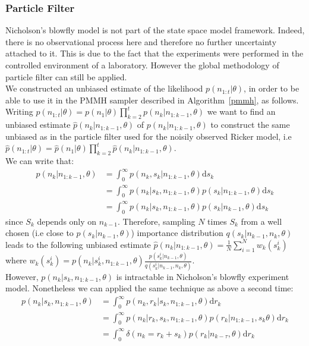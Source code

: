 \documentclass[12pt]{article}
\begin{document}
	\subsubsection{Particle Filter}
	Nicholson's blowfly model is not part of the state space model framework. Indeed, there is no observational process here and therefore no further uncertainty attached to it. This is due to the fact that the experiments were performed in the controlled environment of a laboratory. However the global methodology of particle filter can still be applied. \\
	We constructed an unbiased estimate of the likelihood $p(n_{1:t}|\theta)$, in order to be able to use it in the PMMH sampler described in Algorithm~\ref{pmmh}, as follows. \\
	Writing $p(n_{1:t}|\theta) = p(n_1|\theta)\prod_{k=2}^{t}p(n_k|n_{1:k-1}, \theta)$ we want to find an unbiased estimate $\hat{p}(n_k|n_{1:k-1}, \theta)$ of $p(n_k|n_{1:k-1}, \theta)$ to construct the same unbiased as in the particle filter used for the noisily observed Ricker model, i.e $\hat{p}(n_{1:t}|\theta)=\hat{p}(n_1|\theta)\prod_{k=2}^{t}\hat{p}(n_k|n_{1:k-1}, \theta)$. \\
	We can write that:
	\begin{align*}
	p(n_k|n_{1:k-1}, \theta) & = \int_{0}^{\infty}p(n_k, s_k |n_{1:k-1}, \theta)\mathrm{d}s_k \\
	& = \int_{0}^{\infty}p(n_k |s_k, n_{1:k-1}, \theta)p(s_k|n_{1:k-1}, \theta)\mathrm{d}s_k \\
	& = \int_{0}^{\infty}p(n_k |s_k, n_{1:k-1}, \theta)p(s_k|n_{k-1}, \theta)\mathrm{d}s_k
	\end{align*}
	since $S_k$ depends only on $n_{k-1}$.
	Therefore, sampling $N$ times $S_k$ from a well chosen (i.e close to $p(s_k|n_{k-1}, \theta)$) importance distribution $q(s_k|n_{k-1}, n_k, \theta)$ leads to the following unbiased estimate $\hat{p}(n_k|n_{1:k-1}, \theta) = \frac{1}{N}\sum_{i=1}^{N}w_k(s_k^i)$ where $w_k(s_k^i) =p(n_k |s_k^i, n_{1:k-1}, \theta)\frac{p(s_k^i|n_{k-1}, \theta)}{q(s_k^i|n_{k-1}, n_k, \theta)}$. \\
	However, $p(n_k |s_k, n_{1:k-1}, \theta)$ is intractable in Nicholson's blowfly experiment model. Nonetheless we can applied the same technique as above a second time:
	\begin{align*}
	p(n_k |s_k, n_{1:k-1}, \theta) & = \int_{0}^{\infty}p(n_k, r_k|s_k, n_{1:k-1}, \theta)\mathrm{d}r_k \\
	& = \int_{0}^{\infty}p(n_k| r_k, s_k, n_{1:k-1}, \theta)p( r_k|n_{1:k-1}, s_k \theta)\mathrm{d}r_k \\
	& = \int_{0}^{\infty}\delta(n_k = r_k + s_k)p(r_k|n_{k-\tau}, \theta)\mathrm{d}r_k
	\end{align*}
\end{document}
